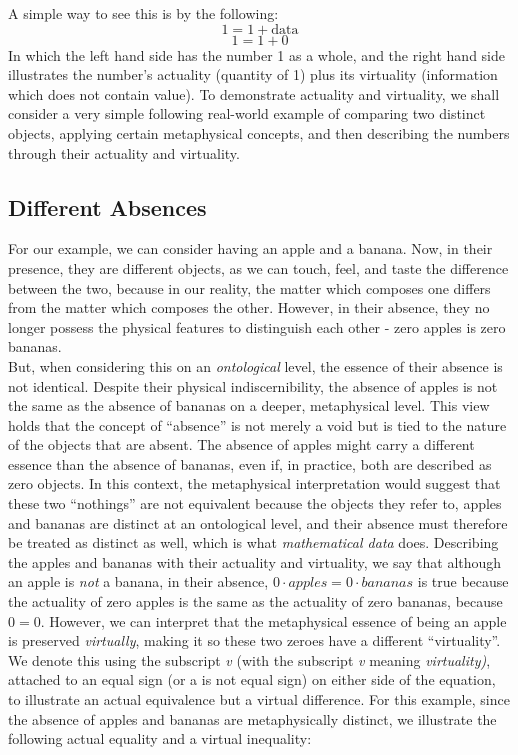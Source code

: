 \documentclass{article}
\begin{document}
A simple way to see this is by the following:$$1=1+\text{data}$$ $$1=1+0$$ In which the left hand side has the number 1 as a whole, and the right hand side illustrates the number's actuality (quantity of 1) plus its virtuality (information which does not contain value). To demonstrate actuality and virtuality, we shall consider a very simple following real-world example of comparing two distinct objects, applying certain metaphysical concepts, and then describing the numbers through their actuality and virtuality.
\subsection{Different Absences}For our example, we can consider having an apple and a banana. Now, in their presence, they are different objects, as we can touch, feel, and taste the difference between the two, because in our reality, the matter which composes one differs from the matter which composes the other. However, in their absence, they no longer possess the physical features to distinguish each other - zero apples is zero bananas.\\ But, when considering this on an \textit{ontological} level, the essence of their absence is not identical. Despite their physical indiscernibility, the absence of apples is not the same as the absence of bananas on a deeper, metaphysical level. This view holds that the concept of ``absence'' is not merely a void but is tied to the nature of the objects that are absent. The absence of apples might carry a different essence than the absence of bananas, even if, in practice, both are described as zero objects. In this context, the metaphysical interpretation would suggest that these two ``nothings'' are not equivalent because the objects they refer to, apples and bananas are distinct at an ontological level, and their absence must therefore be treated as distinct as well, which is what \textit{mathematical data} does. Describing the apples and bananas with their actuality and virtuality, we say that although an apple is \textit{not} a banana, in their absence, $0\cdot apples=0\cdot bananas$ is true because the actuality of zero apples is the same as the actuality of zero bananas, because $0=0$. However, we can interpret that the metaphysical essence of being an apple is preserved \textit{virtually}, making it so these two zeroes have a different ``virtuality''. We denote this using the subscript \textit{v} (with the subscript \textit{v} meaning \textit{virtuality)}, attached to an equal sign (or a is not equal sign) on either side of the equation, to illustrate an actual equivalence but a virtual difference. For this example, since the absence of apples and bananas are metaphysically distinct, we illustrate the following actual equality and a virtual inequality: 
\end{document}
